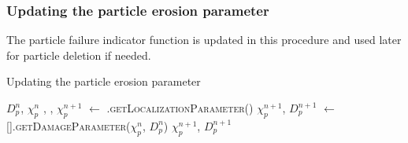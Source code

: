 \subsubsection{Updating the particle erosion parameter}
The particle failure indicator function is updated in this procedure and used later for 
particle deletion if needed.
\begin{breakablealgorithm}
  \caption{Updating the particle erosion parameter}
  \begin{algorithmic}[1]
    \Require $D_p^n$, $\chi^n_p$
             , , 
            \State $\chi^{n+1}_p$ $\leftarrow$
               .\textsc{getLocalizationParameter}()
          \Else
            \State $\chi^{n+1}_p$, $D_p^{n+1}$ $\leftarrow$
               [\TTmatl].\textsc{getDamageParameter}($\chi^n_p$, $D^n_p$)
             \WWRP {}
          \EndIf
        \EndFor
      \EndFor
      \State \Return $\chi^{n+1}_p$, $D_p^{n+1}$
    \EndProcedure
  \end{algorithmic}
\end{breakablealgorithm}

